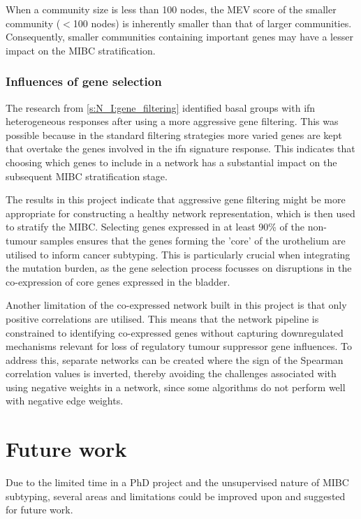 When a community size is less than 100 nodes, the MEV score of the smaller community (\(<\)100 nodes) is inherently smaller than that of larger communities. Consequently, smaller communities containing important genes may have a lesser impact on the MIBC stratification.


\subsubsection*{Influences of gene selection}

The research from \cref{s:N_I:gene_filtering} identified basal groups with \acrshort{ifn} heterogeneous responses after using a more aggressive gene filtering. This was possible because in the standard filtering strategies more varied genes are kept that overtake the genes involved in the \acrshort{ifn} signature response. This indicates that choosing which genes to include in a network has a substantial impact on the subsequent MIBC stratification stage. 

The results in this project indicate that aggressive gene filtering might be more appropriate for constructing a healthy network representation, which is then used to stratify the MIBC. Selecting genes expressed in at least 90\% of the non-tumour samples ensures that the genes forming the 'core' of the urothelium are utilised to inform cancer subtyping. This is particularly crucial when integrating the mutation burden, as the gene selection process focusses on disruptions in the co-expression of core genes expressed in the bladder.

Another limitation of the co-expressed network built in this project is that only positive correlations are utilised. This means that the network pipeline is constrained to identifying co-expressed genes without capturing downregulated mechanisms relevant for loss of regulatory tumour suppressor gene influences. To address this, separate networks can be created where the sign of the Spearman correlation values is inverted, thereby avoiding the challenges associated with using negative weights in a network, since some algorithms do not perform well with negative edge weights.


\section{Future work} \label{s:future_work}

Due to the limited time in a PhD project and the unsupervised nature of MIBC subtyping, several areas and limitations could be improved upon and suggested for future work.

